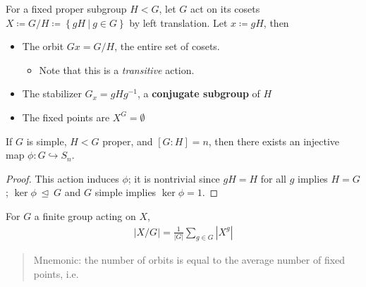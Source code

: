 \begin{example}[?]

For a fixed proper subgroup \(H< G\), let \(G\) act on its cosets
\(X \coloneqq G/H \coloneqq\left\{{gH{~\mathrel{\Big|}~}g\in G}\right\}\)
by left translation. Let \(x \coloneqq gH\), then

\begin{itemize}
\item
  The orbit \(Gx = G/H\), the entire set of cosets.

  \begin{itemize}
  \tightlist
  \item
    Note that this is a \emph{transitive} action.
  \end{itemize}
\item
  The stabilizer \(G_{x} = gHg^{-1}\), a \textbf{conjugate subgroup} of
  \(H\)
\item
  The fixed points are \(X^G = \emptyset\)
\end{itemize}

\end{example}

\begin{proposition}

If \(G\) is simple, \(H < G\) proper, and \([G:H] = n\), then there
exists an injective map \(\phi: G \hookrightarrow S_n\).

\end{proposition}

\begin{proof}

This action induces \(\phi\); it is nontrivial since \(gH = H\) for all
\(g\) implies \(H = G\); \(\ker \phi {~\trianglelefteq~}G\) and \(G\)
simple implies \(\ker \phi = 1\).

\end{proof}

\begin{corollary}

For \(G\) a finite group acting on \(X\),
\begin{align*}
{\left\lvert {X/G} \right\rvert} = \frac{1}{{\left\lvert {G} \right\rvert} }\sum_{g\in G} {\left\lvert {X^g} \right\rvert}
\end{align*}

\begin{quote}
Mnemonic: the number of orbits is equal to the average number of fixed
points, i.e.
\end{quote}

\end{corollary}

